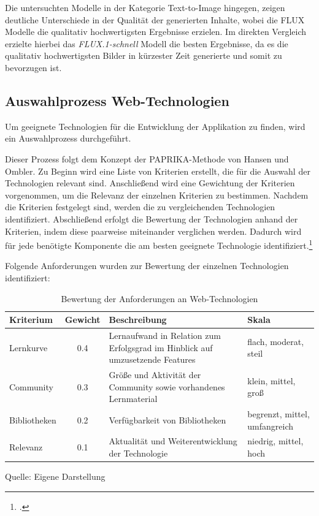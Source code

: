 Die untersuchten Modelle in der Kategorie Text-to-Image hingegen, zeigen deutliche Unterschiede in der Qualität der generierten Inhalte, wobei die FLUX Modelle die qualitativ hochwertigsten Ergebnisse erzielen.
Im direkten Vergleich erzielte hierbei das \textit{FLUX.1-schnell} Modell die besten Ergebnisse, da es die qualitativ hochwertigsten Bilder in kürzester Zeit generierte und somit zu bevorzugen ist.

\subsection{Auswahlprozess Web-Technologien}
Um geeignete Technologien für die Entwicklung der Applikation zu finden, wird ein Auswahlprozess durchgeführt.

Dieser Prozess folgt dem Konzept der \ac{PAPRIKA}-Methode von Hansen und Ombler.
Zu Beginn wird eine Liste von Kriterien erstellt, die für die Auswahl der Technologien relevant sind.
Anschließend wird eine Gewichtung der Kriterien vorgenommen, um die Relevanz der einzelnen Kriterien zu bestimmen.
Nachdem die Kriterien festgelegt sind, werden die zu vergleichenden Technologien identifiziert.
Abschließend erfolgt die Bewertung der Technologien anhand der Kriterien, indem diese paarweise miteinander verglichen werden.
Dadurch wird für jede benötigte Komponente die am besten geeignete Technologie identifiziert.\footcite{Paprika2008}

Folgende Anforderungen wurden zur Bewertung der einzelnen Technologien identifiziert:

\begin{table}[htbp]
  \centering
  \begin{tabular}{|p{2cm}|c|p{5cm}|p{4cm}|}
      \hline
      \textbf{Kriterium} & \textbf{Gewicht} & \textbf{Beschreibung} & \textbf{Skala}\\ \hline
      {Lernkurve} & 0.4 & Lernaufwand in Relation zum Erfolgsgrad im Hinblick auf umzusetzende Features & flach, moderat, steil\\ \hline
      {Community} & 0.3 & Größe und Aktivität der Community sowie vorhandenes Lernmaterial & klein, mittel, groß\\ \hline
      {Bibliotheken} & 0.2 & Verfügbarkeit von Bibliotheken & begrenzt, mittel, umfangreich\\ \hline
      {Relevanz} & 0.1 & Aktualität und Weiterentwicklung der Technologie & niedrig, mittel, hoch\\ \hline
  \end{tabular}
  \caption{Bewertung der Anforderungen an Web-Technologien}\label{tab:table}
  \vspace{0.5cm}
  \raggedright Quelle: Eigene Darstellung
\end{table}

